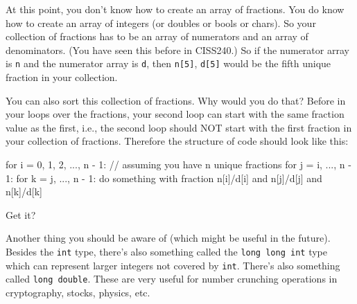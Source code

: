 At this point, you don't know how to create an array of fractions.
You do know how to create an array of integers (or doubles or bools or chars).
So your collection of fractions has to be an array of numerators
and an array of denominators.
(You have seen this before in CISS240.)
So if the numerator array is \verb!n!
and the numerator array is \verb!d!,
then \verb!n[5]!,
\verb!d[5]!
would be the fifth unique fraction in your collection.

You can also sort this collection of fractions.
Why would you do that?
Before in your loops over the fractions, your second loop
can start with the same fraction value as the first, i.e., the second
loop should NOT start with the first fraction in your collection of fractions.
Therefore the structure of code should look like this:
\begin{console}
for i = 0, 1, 2, ..., n - 1: // assuming you have n unique fractions
    for j = i, ..., n - 1:
        for k = j, ..., n - 1:
            do something with fraction n[i]/d[i] and n[j]/d[j] and n[k]/d[k]  
\end{console}
Get it?

Another thing you should be aware of (which might be useful in the future).
Besides the \verb!int! type, there's also something called the
\verb!long long int! type which can represent larger integers not covered by
\verb!int!.
There's also something called \verb!long double!.
These are very useful for number crunching operations in cryptography, stocks,
physics, etc.


